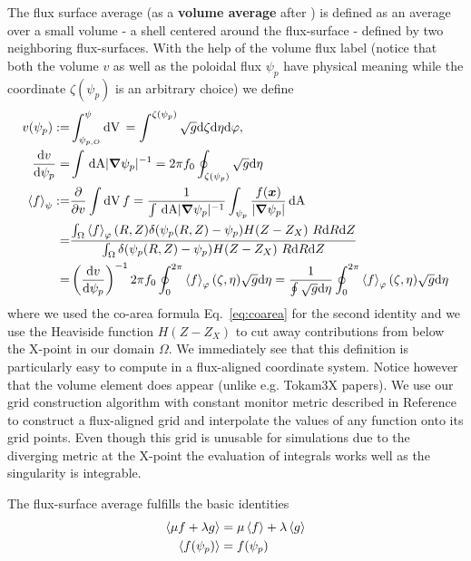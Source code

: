 The flux surface average (as a {\bf volume average} after \cite{haeseleer}) is defined as an average over a
small volume - a shell centered around the flux-surface - defined by two neighboring flux-surfaces.
With the help of the volume
flux label (notice that both the volume $v$ as well as the poloidal flux $\psi_p$ have physical
meaning while the coordinate $\zeta(\psi_p)$ is an arbitrary choice) we define
\begin{align} \label{eq:fsa_vol}
v(\psi_p) :=& \int_{\psi_{p,O}}^\psi \mathrm{dV}\, = \int^{\zeta(\psi_p)} \sqrt{g}\mathrm{d}\zeta\mathrm{d}\eta\mathrm{d}\varphi,
\\
\frac{\mathrm{d} v}{\mathrm{d}\psi_p} =& \int\,\mathrm{dA} |{\boldsymbol{\nabla}}\psi_p|^{-1} = 2\pi f_0\oint_{\zeta(\psi_p)} \sqrt{g}\mathrm{d}\eta \\
\left \langle  f  \right \rangle_\psi :=& \frac{\partial}{\partial v} \int \mathrm{dV}\, f
 = \frac{1}{\int \,\mathrm{dA} |{\boldsymbol{\nabla}}\psi_p|^{-1} } \int_{\psi_p} \frac{f({\boldsymbol{x}})}{|{\boldsymbol{\nabla}}\psi_p|} \,\mathrm{dA} \nonumber\\
=& \frac{\int_\Omega \left \langle  f \right\rangle_\varphi(R,Z) \delta(\psi_p(R,Z)-\psi_{p})H(Z-Z_X)\ R \mathrm{d} R \mathrm{d} Z}
{\int_\Omega \delta(\psi_p(R,Z)-\psi_{p})H(Z-Z_X)\ R \mathrm{d} R \mathrm{d} Z}\nonumber\\
 =& \left(\frac{\mathrm{d} v}{\mathrm{d}\psi_p }\right)^{-1} 2\pi f_0 \oint_0^{2\pi} \left \langle  f \right\rangle_\varphi(\zeta,\eta) \sqrt{g}\mathrm{d}\eta
 = \frac{1}{\oint \sqrt{g}\mathrm{d}\eta } \oint_0^{2\pi} \left \langle  f \right\rangle_\varphi(\zeta,\eta) \sqrt{g}\mathrm{d}\eta
\end{align}
where we used the co-area formula Eq.~\eqref{eq:coarea} for the second identity
and we use the Heaviside function $H(Z-Z_X)$ to cut away contributions from below the X-point
in our domain $\Omega$.
 We immediately see that this definition is particularly easy to compute
 in a flux-aligned coordinate system. Notice however that the volume element
 does appear (unlike e.g. Tokam3X papers).
 We use our grid construction algorithm with constant monitor metric described in Reference~\cite{Wiesenberger2018} to construct a flux-aligned grid and interpolate
 the values of any function onto its grid points.
 Even though this grid is unusable for simulations due to the diverging metric at the X-point the
 evaluation of integrals works well as the singularity is integrable.

The flux-surface average fulfills the basic identities
\begin{align}
\label{eq:fsa_identities}
\left \langle  \mu f + \lambda g \right \rangle &= \mu\left \langle  f \right \rangle + \lambda \left \langle  g \right \rangle \\
\left \langle  f(\psi_p) \right \rangle &= f(\psi_p)
\end{align}

